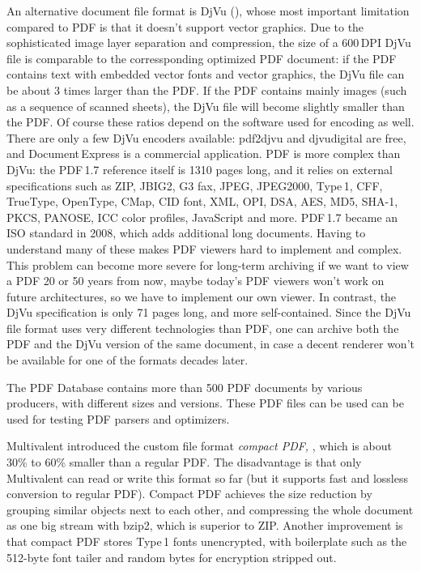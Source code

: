 \documentclass{ltugproc}
\def\cmd{\textsf}
\begin{document}
An alternative document file format is DjVu (\cite{djvu-tutorial}),
whose most important limitation compared to PDF is that it doesn't support
vector graphics. Due to the sophisticated image layer separation and
compression, the size of a 600\,DPI DjVu file is comparable to the
corressponding optimized PDF document:
if the PDF contains text with embedded vector fonts and
vector graphics, the DjVu file can be about 3 times larger than the PDF.
If the PDF contains mainly images (such
as a sequence of scanned sheets), the DjVu file will become slightly smaller
than the PDF. 
Of course these ratios depend on the software used for encoding as well.
There are only a few DjVu encoders available: \cmd{pdf2djvu} and
\cmd{djvudigital} are free, and Document\,Express is a commercial
application. PDF is more complex than DjVu: the PDF\,1.7 reference
\cite{pdfref} itself is
1310 pages long, and it relies on external specifications such as ZIP,
JBIG2, G3 fax, JPEG, JPEG2000, Type\,1, CFF, TrueType, OpenType, CMap,
CID font, XML, OPI, DSA, AES, MD5, SHA-1, PKCS, PANOSE, ICC color profiles,
JavaScript and more. PDF\,1.7 became an ISO standard \cite{pdf-iso} in 2008,
which adds additional long documents.
Having to understand many of these makes PDF viewers
hard to implement and complex. This problem can become more severe for
long-term archiving if we want to view a PDF 20 or 50 years from now, maybe
today's PDF viewers won't work on future architectures, so we have to
implement our own viewer.
In contrast, the DjVu specification \cite{djvu3spec} is only 71
pages long, and more self-contained.
Since the DjVu file format uses very different technologies than PDF, one
can archive both the PDF and the DjVu version of the same document, in case
a decent renderer won't be available for one of the formats decades later.

The PDF Database \cite{pdfdb} contains more than 500 PDF documents by various
producers, with different sizes and versions. These PDF files can be used
can be used for testing PDF parsers and optimizers.

Multivalent introduced the custom file format \emph{compact PDF,}
\cite{multivalent-compact,pdf-diet}, which is about 30\% to 60\% smaller than a
regular PDF. The disadvantage is that only Multivalent can read or write
this format so far (but it supports fast and lossless conversion to regular
PDF). Compact PDF achieves the size reduction by grouping similar objects
next to each other, and compressing the whole document as one big stream
with \cmd{bzip2}, which is superior to ZIP. Another improvement is that
compact PDF stores Type\,1 fonts unencrypted, with boilerplate such as the
512-byte font tailer and random bytes for encryption stripped out.
\end{document}
